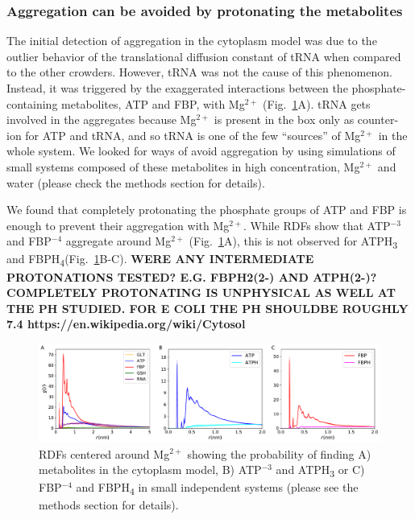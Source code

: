 \documentclass[journal=jcisd8,manuscript=article]{achemso}
\begin{document}
\subsubsection{Aggregation can be avoided by protonating the metabolites}

The initial detection of aggregation in the cytoplasm model was due to
the outlier behavior of the translational diffusion constant of tRNA
when compared to the other crowders. However, tRNA was not the cause of this
phenomenon. Instead, it was triggered by the exaggerated interactions
between the phosphate-containing metabolites, ATP and FBP, with
Mg$^{2+}$ (Fig.~\ref{fig:avoiding_aggregation}A). tRNA gets involved
in the aggregates because Mg$^{2+}$ is present in the box only as
counter-ion for ATP and tRNA, and so tRNA is one of the few
``sources'' of Mg$^{2+}$ in the whole system. We looked for ways of
avoid aggregation by using simulations of small systems composed of
these metabolites in high concentration, Mg$^{2+}$ and water (please
check the methods section for details).

We found that completely protonating the phosphate groups of ATP and
FBP is enough to prevent their aggregation with Mg$^{2+}$. While RDFs
show that ATP$^{-3}$ and FBP$^{-4}$ aggregate around Mg$^{2+}$
(Fig.~\ref{fig:avoiding_aggregation}A), this is not observed for
ATPH\textsubscript{3} and
FBPH\textsubscript{4}(Fig.~\ref{fig:avoiding_aggregation}B-C).  {\bf
  WERE ANY INTERMEDIATE PROTONATIONS TESTED? E.G. FBPH2(2-) AND ATPH(2-)?
  COMPLETELY PROTONATING IS UNPHYSICAL AS WELL AT THE PH STUDIED. FOR E COLI THE PH SHOULDBE ROUGHLY 7.4 https://en.wikipedia.org/wiki/Cytosol}

\begin{figure}[H]
\hspace*{-2cm}\includegraphics[scale=0.5]{rdf_mg.pdf}
\caption{RDFs centered around Mg$^{2+}$ showing the probability of
  finding A) metabolites in the cytoplasm model, B) ATP$^{-3}$ and
  ATPH\textsubscript{3} or C) FBP$^{-4}$ and FBPH\textsubscript{4} in
  small independent systems (please see the methods section for
  details).}
\label{fig:avoiding_aggregation}
\end{figure}
\end{document}
